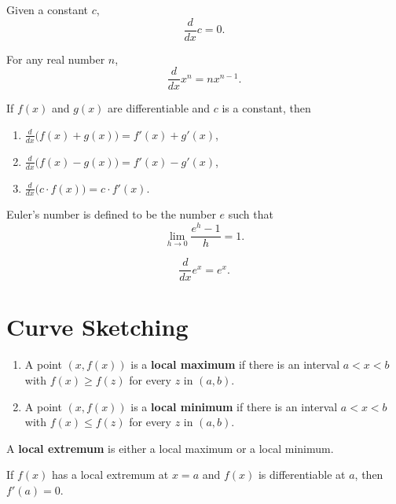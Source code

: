 \documentclass{ximera}
\newcommand{\ddx}{\frac{d}{dx}}
\begin{document}
\begin{theorem}
Given a constant $c$,
\[
\ddx c = 0.
\]
\end{theorem}


\begin{theorem}
For any real number $n$,
\[
\ddx x^n = n x^{n-1}.
\]
\end{theorem}



\begin{theorem}
If $f(x)$ and $g(x)$ are differentiable and $c$ is a constant, then 
\begin{enumerate}
\item\label{SR:1} $\ddx \big( f(x) + g(x)\big) = f'(x) + g'(x)$,
\item $\ddx \big( f(x) - g(x)\big) = f'(x) - g'(x)$,
\item $\ddx \big(c\cdot f(x)\big) = c\cdot f'(x)$.
\end{enumerate}
\end{theorem}


\begin{definition}
Euler's number is defined to be the number $e$ such that
\[
\lim_{h\to 0} \frac{e^h-1}{h} = 1.
\]
\end{definition}

\begin{theorem}
\[
\ddx e^x = e^x.
\]
\end{theorem}

\section*{Curve Sketching}



\begin{definition}\hfil
\begin{enumerate}
\item A point $(x,f(x))$ is a \textbf{local maximum} if there is an interval $a<x<b$ with $f(x)\ge f(z)$ for
  every $z$ in $(a,b)$.
\item A point $(x,f(x))$ is a \textbf{local minimum} if
  there is an interval $a<x<b$ with $f(x)\le f(z)$ for every $z$ in
  $(a,b)$.
\end{enumerate}
A \textbf{local extremum} is either a local
maximum or a local minimum.
\end{definition}


\begin{theorem}
If $f(x)$ has a local extremum at $x=a$ and $f(x)$ is differentiable
at $a$, then $f'(a)=0$.
\end{theorem}
\end{document}
